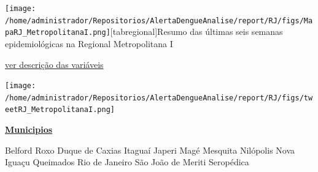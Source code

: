 \documentclass[10pt]{article} %
\begin{document}

\begin{minipage}[t]{.66\linewidth}\hypertarget{regional}{}\texttt{[image: /home/administrador/Repositorios/AlertaDengueAnalise/report/RJ/figs/MapaRJ\_MetropolitanaI.png]}[tabregional]{Resumo das últimas seis semanas epidemiológicas na Regional Metropolitana I }\begin{center}\end{center}\small{\hyperlink{vartab}{ver descrição das variáveis}}\begin{center}\texttt{[image: /home/administrador/Repositorios/AlertaDengueAnalise/report/RJ/figs/tweetRJ\_MetropolitanaI.png]}\end{center}\end{minipage}\hfill\begin{minipage}[t]{.30\linewidth}\begin{mdframed}[style=sidebar,frametitle={}]\textbf{\hyperlink{municips}{Municipios}}\begin{itemize}\gsquare Belford Roxo 
\gsquare Duque de Caxias 
\gsquare Itaguaí 
\gsquare Japeri 
\gsquare Magé 
\gsquare Mesquita 
\gsquare Nilópolis 
\gsquare Nova Iguaçu 
\gsquare Queimados 
\gsquare Rio de Janeiro 
\gsquare São João de Meriti 
\gsquare Seropédica \end{itemize}\BackToContents\end{mdframed}\hfill\end{minipage}\newpage%
\end{document}

